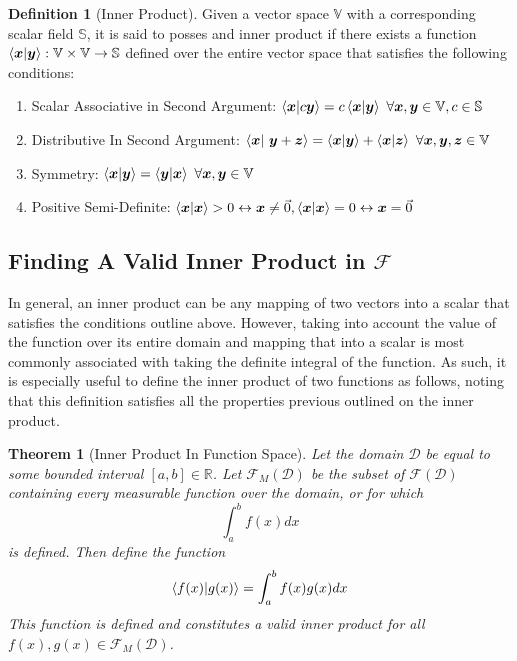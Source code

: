 \documentclass{article}
\newcommand{\B}[1]{\boldsymbol{#1}}
\newcommand*\R{\mathbb{R}}
\newtheorem{theorem}{Theorem}[section]
\theoremstyle{definition}
\newtheorem{definition}{Definition}[section]
\theoremstyle{remark}
\begin{document}
\begin{definition}[Inner Product]
  Given a vector space $\mathbb{V}$ with a corresponding scalar field $\mathbb{S}$, it is said to posses and inner product if there exists
  a function $\braket{\B{x}| \B{y}} : \mathbb{V} \times \mathbb{V} \to \mathbb{S}$ defined over the entire vector space that satisfies the following conditions:

  \begin{enumerate}
    \item Scalar Associative in Second Argument: $\braket{\B{x}|c\B{y}} = c\braket{\B{x}| \B{y}} ~ \forall \B{x}, \B{y} \in \mathbb{V}, c \in \mathbb{S}$
    \item Distributive In Second Argument: $\braket{\B{x}| ~ \B{y} + \B{z}} = \braket{\B{x}| \B{y}} + \braket{\B{x}|\B{z}}  ~ \forall \B{x}, \B{y}, \B{z} \in \mathbb{V}$
    \item Symmetry: $\braket{\B{x}| \B{y}} = \braket{\B{y}|\B{x}} ~ \forall \B{x}, \B{y} \in \mathbb{V}$
    \item Positive Semi-Definite: $\braket{\B{x}| \B{x}} > 0 \leftrightarrow \B{x} \neq \vec{0}, \braket{\B{x}| \B{x}} = 0 \leftrightarrow \B{x} = \vec{0}$
  \end{enumerate}
  \label{def:InnerProduct}
\end{definition}

\subsection{Finding A Valid Inner Product in $\mathscr{F}$}

In general, an inner product can be any mapping of two vectors into a scalar that satisfies the conditions outline above.
However, taking into account the value of the function over its entire 
domain and mapping that into a scalar is most commonly associated with 
taking the definite integral of the function. As such, it is especially useful
to define the inner product of two functions as follows, noting that
this definition satisfies all the properties previous outlined on the 
inner product. 

\begin{theorem}[Inner Product In Function Space]
  Let the domain $\mathcal{D}$ be equal to some bounded interval $[a, b] \in \R$.
  Let $\mathscr{F}_M(\mathcal{D})$ be the subset of $\mathscr{F}(\mathcal{D})$ containing every 
  measurable function over the domain, or for which 
  $$ \int_a^b f(x) dx $$ is defined. Then define the function 
  \begin{equation}
    \braket{f(x)| g(x)} = \int_a^b f(x) g(x) dx
    \label{eq:standardIP}
  \end{equation}
  This function is defined and constitutes a valid inner product for all $f(x), g(x) \in \mathscr{F}_M(\mathcal{D})$.
\end{theorem}
\end{document}
